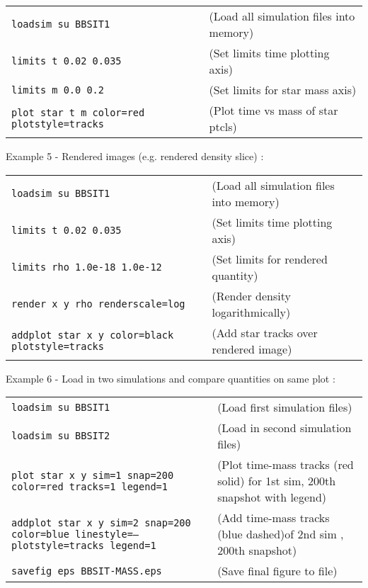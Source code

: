 \documentclass[a4paper]{article}
\newcommand{\var}[1]{\texttt{#1}}
\begin{document}
\begin{tabular}{p{7cm}p{6cm}}
\var{loadsim su BBSIT1} &               (Load all simulation files into memory) \\
\var{limits t 0.02 0.035} &                    (Set limits time plotting axis) \\
\var{limits m 0.0 0.2} &                      (Set limits for star mass axis) \\
\var{plot star t m color=red plotstyle=tracks} & (Plot time vs mass of star ptcls)     
\end{tabular}
\newline


\noindent Example 5 - Rendered images (e.g. rendered density slice) : \\

\begin{tabular}{p{7cm}p{6cm}}
\var{loadsim su BBSIT1} &       (Load all simulation files into memory) \\
\var{limits t 0.02 0.035} &            (Set limits time plotting axis) \\
\var{limits rho 1.0e-18 1.0e-12} &     (Set limits for rendered quantity) \\
\var{render x y rho renderscale=log} & (Render density logarithmically) \\
\var{addplot star x y color=black plotstyle=tracks} & (Add star tracks over rendered image)
\end{tabular}
\newline


\noindent Example 6 - Load in two simulations and compare quantities on same plot : \\

\begin{tabular}{p{7cm}p{6cm}}
\var{loadsim su BBSIT1} &              (Load first simulation files) \\
\var{loadsim su BBSIT2} &              (Load in second simulation files) \\
\var{plot star x y sim=1 snap=200 color=red tracks=1 legend=1} & (Plot time-mass tracks (red solid) for 1st sim, 200th snapshot with legend) \\
\var{addplot star x y sim=2 snap=200 color=blue linestyle=-- plotstyle=tracks legend=1} & (Add time-mass tracks (blue dashed)of 2nd sim , 200th snapshot) \\
\var{savefig eps BBSIT-MASS.eps} & (Save final figure to file)
\end{tabular}
\newline
\end{document}

